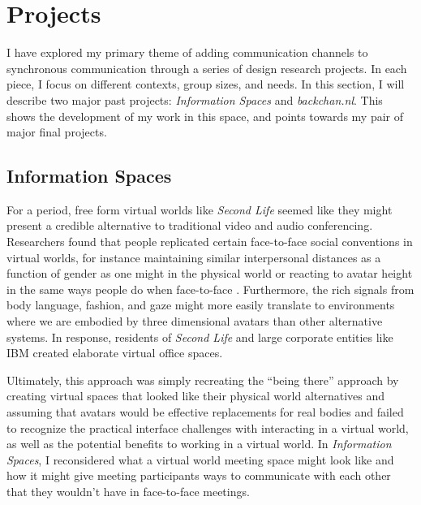 \documentclass{tufte-handout}
\begin{document}
\section{Projects}

I have explored my primary theme of adding communication channels to synchronous communication through a series of design research projects. In each piece, I focus on different contexts, group sizes, and needs. In this section, I will describe two major past projects: \emph{Information Spaces} and \emph{backchan.nl}. This shows the development of my work in this space, and points towards my pair of major final projects.


\subsection{Information Spaces}


For a period, free form virtual worlds  like \emph{Second Life} seemed like they might present a credible alternative to traditional video and audio conferencing. Researchers found that people replicated certain face-to-face social conventions in virtual worlds, for instance maintaining similar interpersonal distances as a function of gender as one might in the physical world \citep{Yee:2007cl} or reacting to avatar height in the same ways people do when face-to-face \citep{Yee:2009vt}. Furthermore, the rich signals from body language, fashion, and gaze might more easily translate to environments where we are embodied by three dimensional avatars than other alternative systems. In response, residents of \emph{Second Life} and large corporate entities like IBM \citep{Shami:2010vi} created elaborate virtual office spaces.

Ultimately, this approach was simply recreating the ``being there'' approach by creating virtual spaces that looked like their physical world alternatives and assuming that avatars would be effective replacements for real bodies and failed to recognize the practical interface challenges with interacting in a virtual world, as well as the potential benefits to working in a virtual world. In \emph{Information Spaces}, I reconsidered what a virtual world meeting space might look like and how it might give meeting participants ways to communicate with each other that they wouldn't have in face-to-face meetings. 
\end{document}
